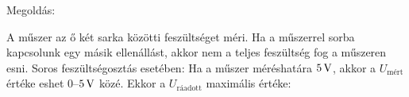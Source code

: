 
\ifdefined\megoldas

 Megoldás: 

 A műszer az ő két sarka közötti feszültséget méri. Ha a műszerrel sorba kapcsolunk egy másik ellenállást, akkor nem a teljes feszültség fog a műszeren esni. Soros feszültségosztás esetében:
 Ha a műszer méréshatára $5\mathrm{\, V}$, akkor a $U_\text{mért}$ értéke eshet $0$--$5\mathrm{\, V}$ közé. Ekkor a $U_\text{ráadott}$ maximális értéke:

\fi